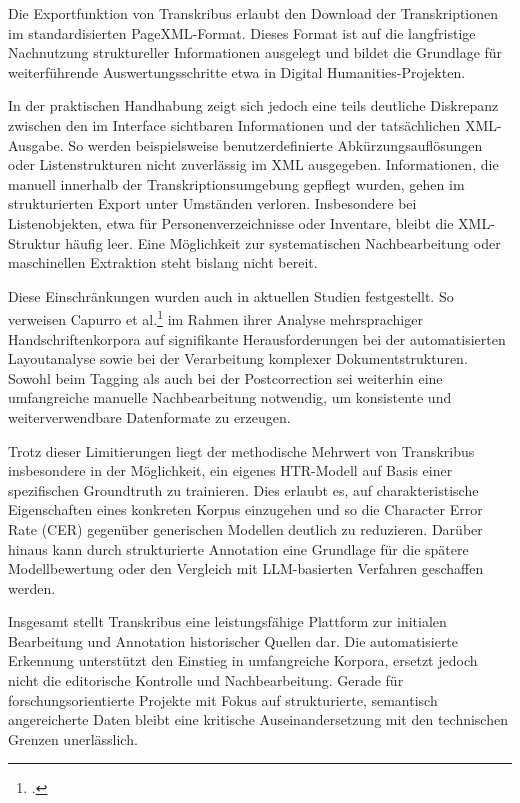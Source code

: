 \documentclass[12pt, a4paper, ngerman, bidi=default]{article}
\let\cite\footcite
\begin{document}
Die Exportfunktion von Transkribus erlaubt den Download der Transkriptionen im standardisierten PageXML-Format. Dieses Format ist auf die langfristige Nachnutzung 
struktureller Informationen ausgelegt und bildet die Grundlage für weiterführende Auswertungsschritte etwa in Digital Humanities-Projekten.

In der praktischen Handhabung zeigt sich jedoch eine teils deutliche Diskrepanz zwischen den im Interface sichtbaren Informationen und der tatsächlichen XML-Ausgabe. 
So werden beispielsweise benutzerdefinierte Abkürzungsauflösungen oder Listenstrukturen nicht zuverlässig im XML ausgegeben. 
Informationen, die manuell innerhalb der Transkriptionsumgebung gepflegt wurden, gehen im strukturierten Export unter Umständen verloren. 
Insbesondere bei Listenobjekten, etwa für Personenverzeichnisse oder Inventare, bleibt die XML-Struktur häufig leer. Eine Möglichkeit zur systematischen Nachbearbeitung 
oder maschinellen Extraktion steht bislang nicht bereit.

Diese Einschränkungen wurden auch in aktuellen Studien festgestellt. So verweisen Capurro et al.\cite[][]{capurro_experimenting_2023} im Rahmen ihrer Analyse mehrsprachiger Handschriftenkorpora 
auf signifikante Herausforderungen bei der automatisierten Layoutanalyse sowie bei der Verarbeitung komplexer Dokumentstrukturen. 
Sowohl beim Tagging als auch bei der Postcorrection sei weiterhin eine umfangreiche manuelle Nachbearbeitung notwendig, um konsistente und weiterverwendbare Datenformate zu erzeugen.

Trotz dieser Limitierungen liegt der methodische Mehrwert von Transkribus insbesondere in der Möglichkeit, ein eigenes HTR-Modell auf Basis einer spezifischen Groundtruth zu trainieren. 
Dies erlaubt es, auf charakteristische Eigenschaften eines konkreten Korpus einzugehen und so die Character Error Rate (CER) gegenüber generischen Modellen deutlich zu reduzieren. 
Darüber hinaus kann durch strukturierte Annotation eine Grundlage für die spätere Modellbewertung oder den Vergleich mit LLM-basierten Verfahren geschaffen werden.

Insgesamt stellt Transkribus eine leistungsfähige Plattform zur initialen Bearbeitung und Annotation historischer Quellen dar. 
Die automatisierte Erkennung unterstützt den Einstieg in umfangreiche Korpora, ersetzt jedoch nicht die editorische Kontrolle und Nachbearbeitung. 
Gerade für forschungsorientierte Projekte mit Fokus auf strukturierte, semantisch angereicherte Daten bleibt eine kritische Auseinandersetzung mit den technischen Grenzen unerlässlich.
\end{document}
